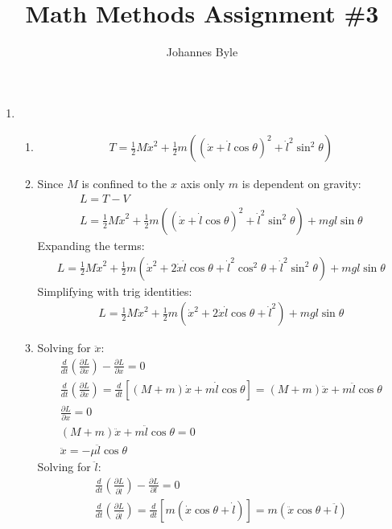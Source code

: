 \documentclass[12pt]{article}
\title{Math Methods Assignment \#3}
\author{Johannes Byle}
\newcommand{\p}[2]{\frac{\partial #1}{\partial #2}}
\newcommand{\der}[2]{\frac{d #1}{d #2}}
\begin{document}
  \maketitle
  \begin{enumerate}
    \item
    \begin{enumerate}
      \item
      \begin{gather}
        T=\frac{1}{2}M\dot{x}^2+\frac{1}{2}m((\dot{x}+\dot{l}\cos\theta)^2+\dot{l}^2\sin^2\theta)
      \end{gather}
      \item
      Since $M$ is confined to the $x$ axis only $m$ is dependent on gravity:
      \begin{gather}
        L=T-V\\
        L=\frac{1}{2}M\dot{x}^2+\frac{1}{2}m((\dot{x}+\dot{l}\cos\theta)^2+\dot{l}^2\sin^2\theta)+mgl\sin\theta
      \end{gather}
      Expanding the terms:
      \begin{gather}
        L=\frac{1}{2}M\dot{x}^2+\frac{1}{2}m(\dot{x}^2+2\dot{x}\dot{l}\cos\theta+\dot{l}^2\cos^2\theta+\dot{l}^2\sin^2\theta)+mgl\sin\theta
      \end{gather}
      Simplifying with trig identities:
      \begin{gather}
        L=\frac{1}{2}M\dot{x}^2+\frac{1}{2}m(\dot{x}^2+2\dot{x}\dot{l}\cos\theta+\dot{l}^2)+mgl\sin\theta
      \end{gather}
      \item
      Solving for $\ddot{x}$:
      \begin{gather}
        \der{}{t}\left(\p{L}{\dot{x}}\right)-\p{L}{x}=0\\
        \der{}{t}\left(\p{L}{\dot{x}}\right)=\der{}{t}\left[(M+m)\dot{x}+m\dot{l}\cos\theta\right]=(M+m)\ddot{x}+m\ddot{l}\cos\theta\\
        \p{L}{x}=0\\
        (M+m)\ddot{x}+m\ddot{l}\cos\theta=0\\
        \ddot{x}=-\mu\ddot{l}\cos\theta
      \end{gather}
      Solving for $\ddot{l}$:
      \begin{gather}
        \der{}{t}\left(\p{L}{\dot{l}}\right)-\p{L}{l}=0\\
        \der{}{t}\left(\p{L}{\dot{l}}\right)=\der{}{t}\left[m(\dot{x}\cos\theta+\dot{l})\right]=m(\ddot{x}\cos\theta+\ddot{l})\\

\end{gather}
\end{enumerate}
\end{enumerate}
\end{document}
